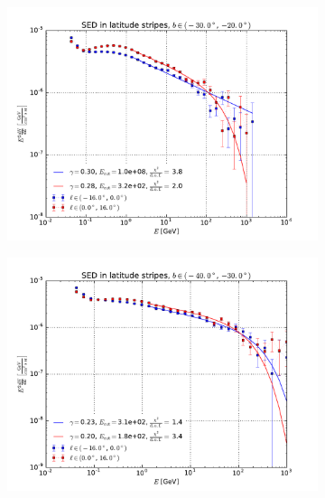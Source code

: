 \documentclass[a4paper]{article}
\begin{document}
\begin{figure}
\begin{subfigure}{0.5\textwidth}
        \includegraphics[width=\textwidth]{spectrum_of_bottom_bubble_in_lat_stripes_20-30.pdf}
    \end{subfigure} 
    \begin{subfigure}{0.5\textwidth}
        \includegraphics[width=\textwidth]{spectrum_of_bottom_bubble_in_lat_stripes_30-40.pdf}
    \end{subfigure}
    \begin{subfigure}{0.5\textwidth}

\end{subfigure}
\end{figure}
\end{document}
